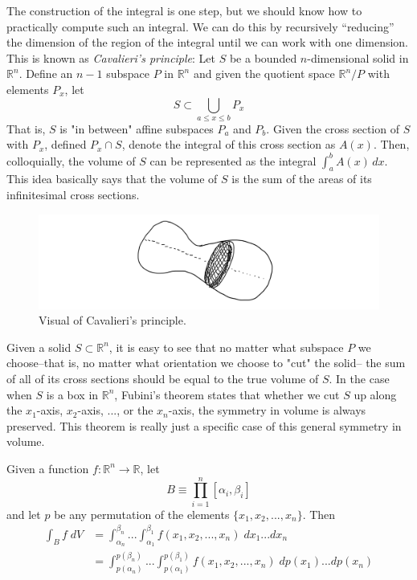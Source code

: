   The construction of the integral is one step, but we should know how to practically compute such an integral. We can do this by recursively ``reducing'' the dimension of the region of the integral until we can work with one dimension. This is known as \textit{Cavalieri's principle}: Let $S$ be a bounded $n$-dimensional solid in $\mathbb{R}^n$. Define an $n-1$ subspace $P$ in $\mathbb{R}^n$ and given the quotient space $\mathbb{R}^n / P$ with elements $P_x$, let 
  \begin{equation}
    S \subset \bigcup_{a \leq x \leq b} P_x
  \end{equation}
  That is, $S$ is "in between" affine subspaces $P_a$ and $P_b$. Given the cross section of $S$ with $P_x$, defined $P_x \cap S$, denote the integral of this cross section as $A(x)$. Then, colloquially, the volume of $S$ can be represented as the integral $\int_a^b A(x)\,dx$. This idea basically says that the volume of $S$ is the sum of the areas of its infinitesimal cross sections. 

  \begin{figure}[H]
    \centering 
    \includegraphics[scale=0.27]{img/Cavalieri_Principle.PNG}
    \caption{Visual of Cavalieri's principle.} 
    \label{fig:cavalieri}
  \end{figure}

  Given a solid $S \subset \mathbb{R}^n$, it is easy to see that no matter what subspace $P$ we choose–that is, no matter what orientation we choose to "cut" the solid– the sum of all of its cross sections should be equal to the true volume of $S$. In the case when $S$ is a box in $\mathbb{R}^n$, Fubini's theorem states that whether we cut $S$ up along the $x_1$-axis, $x_2$-axis, ..., or the $x_n$-axis, the symmetry in volume is always preserved. This theorem is really just a specific case of this general symmetry in volume. 

  \begin{theorem}
    Given a function $f: \mathbb{R}^n \longrightarrow \mathbb{R}$, let 
    \[B \equiv \prod_{i=1}^n [\alpha_i, \beta_i]\]
    and let 
    $p$ be any permutation of the elements $\{x_1, x_2, ..., x_n\}$. Then 
    \begin{align*}
        \int_B f \; d V & = \int_{\alpha_n}^{\beta_n} ... \int_{\alpha_1}^{\beta_1} f(x_1,x_2,...,x_n) \; d x_1 ... d x_n \\
        & = \int_{p(\alpha_n)}^{p(\beta_n)} ... \int_{p(\alpha_1)}^{p(\beta_1)} f(x_1,x_2, ..., x_n) \; d p(x_1) ... d p(x_n) 
    \end{align*}
  \end{theorem}

